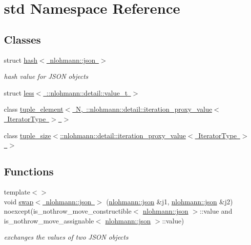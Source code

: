 \hypertarget{namespacestd}{}\section{std Namespace Reference}
\label{namespacestd}
\subsection*{Classes}
\begin{DoxyCompactItemize}
\item 
struct \mbox{\hyperlink{structstd_1_1hash_3_01nlohmann_1_1json_01_4}{hash$<$ nlohmann\+::json $>$}}
\begin{DoxyCompactList}\small\item\em hash value for J\+S\+ON objects \end{DoxyCompactList}\item 
struct \mbox{\hyperlink{structstd_1_1less_3_01_1_1nlohmann_1_1detail_1_1value__t_01_4}{less$<$ \+::nlohmann\+::detail\+::value\+\_\+t $>$}}
\item 
class \mbox{\hyperlink{classstd_1_1tuple__element_3_01_n_00_01_1_1nlohmann_1_1detail_1_1iteration__proxy__value_3_01_iterator_type_01_4_01_4}{tuple\+\_\+element$<$ N, \+::nlohmann\+::detail\+::iteration\+\_\+proxy\+\_\+value$<$ Iterator\+Type $>$ $>$}}
\item 
class \mbox{\hyperlink{classstd_1_1tuple__size_3_1_1nlohmann_1_1detail_1_1iteration__proxy__value_3_01_iterator_type_01_4_01_4}{tuple\+\_\+size$<$\+::nlohmann\+::detail\+::iteration\+\_\+proxy\+\_\+value$<$ Iterator\+Type $>$ $>$}}
\end{DoxyCompactItemize}
\subsection*{Functions}
\begin{DoxyCompactItemize}
\item 
{\footnotesize template$<$$>$ }\\void \mbox{\hyperlink{namespacestd_ace192546038d61d9c28ddfe0c3d732de}{swap$<$ nlohmann\+::json $>$}} (\mbox{\hyperlink{namespacenlohmann_a2bfd99e845a2e5cd90aeaf1b1431f474}{nlohmann\+::json}} \&j1, \mbox{\hyperlink{namespacenlohmann_a2bfd99e845a2e5cd90aeaf1b1431f474}{nlohmann\+::json}} \&j2) noexcept(is\+\_\+nothrow\+\_\+move\+\_\+constructible$<$ \mbox{\hyperlink{namespacenlohmann_a2bfd99e845a2e5cd90aeaf1b1431f474}{nlohmann\+::json}} $>$\+::value and is\+\_\+nothrow\+\_\+move\+\_\+assignable$<$ \mbox{\hyperlink{namespacenlohmann_a2bfd99e845a2e5cd90aeaf1b1431f474}{nlohmann\+::json}} $>$\+::value)
\begin{DoxyCompactList}\small\item\em exchanges the values of two J\+S\+ON objects \end{DoxyCompactList}\end{DoxyCompactItemize}


